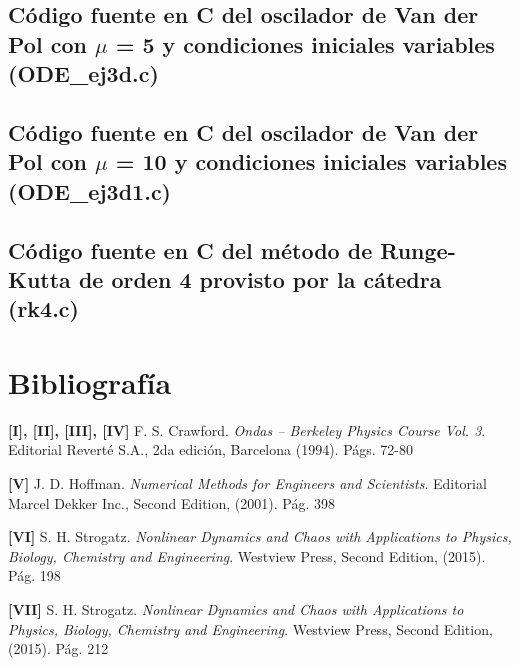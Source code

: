 \documentclass[a4paper,12pt]{article}
\begin{document}



\subsection{C\'odigo fuente en C del oscilador de Van der Pol con $\mu$ = 5 y condiciones iniciales variables (ODE\_ej3d.c)}




\subsection{C\'odigo fuente en C del oscilador de Van der Pol con $\mu$ = 10 y condiciones iniciales variables (ODE\_ej3d1.c)}




\subsection{C\'odigo fuente en C del m\'etodo de Runge-Kutta de orden 4 provisto por la c\'atedra (rk4.c)}


\section{Bibliograf\'ia}
\textbf{[I], [II], [III], [IV]} F. S. Crawford. \textit{Ondas – Berkeley Physics Course Vol. 3}. Editorial Revert\'e S.A., 2da edici\'on, Barcelona (1994). P\'ags. 72-80

\textbf{[V]} J. D. Hoffman. \textit{Numerical Methods for Engineers and Scientists}. Editorial Marcel Dekker Inc., Second Edition, (2001). P\'ag. 398

\textbf{[VI]} S. H. Strogatz. \textit{Nonlinear Dynamics and Chaos with Applications to Physics, Biology, Chemistry and Engineering}. Westview Press, Second Edition, (2015). P\'ag. 198

\textbf{[VII]} S. H. Strogatz. \textit{Nonlinear Dynamics and Chaos with Applications to Physics, Biology, Chemistry and Engineering}. Westview Press, Second Edition, (2015). P\'ag. 212
\end{document}
